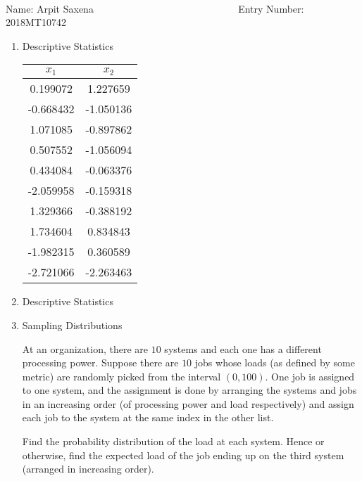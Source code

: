 \documentclass[12pt, oneside]{article}
\begin{document}
\setlength{\textheight}{8.5in}
\\





\vskip 0.5cm

\noindent Name: Arpit Saxena ~  ~~~~~ ~~~~ ~~~~~~~~~~~~~~~~ Entry Number: 2018MT10742 ~~~~~~~~~~~~~



\vskip 0.5cm



\begin{enumerate}

\item	{
    Descriptive Statistics

    \begin{tabular}{cc}
    \toprule
      \(x_1\) &   \(x_2\) \\
    \midrule
     0.199072 &  1.227659 \\
    -0.668432 & -1.050136 \\
     1.071085 & -0.897862 \\
     0.507552 & -1.056094 \\
     0.434084 & -0.063376 \\
    -2.059958 & -0.159318 \\
     1.329366 & -0.388192 \\
     1.734604 &  0.834843 \\
    -1.982315 &  0.360589 \\
    -2.721066 & -2.263463 \\
    \bottomrule
    \end{tabular}
        
}


\item	Descriptive Statistics


\item	{
  Sampling Distributions

  At an organization, there are \(10\) systems and each one has a different processing
  power. Suppose there are \(10\) jobs whose loads (as defined by some metric) are
  randomly picked from the interval \((0, 100)\). One job is assigned to one system,
  and the assignment is done by arranging the systems and jobs in an increasing order
  (of processing power and load respectively) and assign each job to the system at 
  the same index in the other list.

  Find the probability distribution of the load at each system. Hence or otherwise, find
  the expected load of the job ending up on the third system (arranged in increasing order).

}
\end{enumerate}
\end{document}
